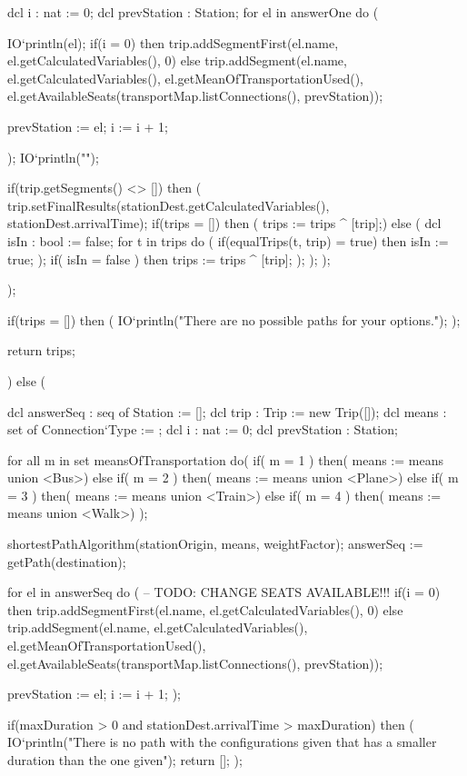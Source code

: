 \begin{vdmpp}[breaklines=true]
     dcl i : nat := 0;
     dcl prevStation : Station;
     for el in answerOne do (
      
      IO`println(el);
      if(i = 0) then trip.addSegmentFirst(el.name, el.getCalculatedVariables(), 0)
      else trip.addSegment(el.name, el.getCalculatedVariables(), el.getMeanOfTransportationUsed(), el.getAvailableSeats(transportMap.listConnections(), prevStation));
      
      prevStation := el;
      i := i + 1;

     );
     IO`println("\n\n");
     
     if(trip.getSegments() <> []) then (
      trip.setFinalResults(stationDest.getCalculatedVariables(), stationDest.arrivalTime);
      if(trips = []) then (
        trips := trips ^ [trip];)
      else (
        dcl isIn : bool := false;
        for t in trips do (
          if(equalTrips(t, trip) = true) then
            isIn := true;
        );
        if( isIn = false ) then
          trips := trips ^ [trip];
      );
     );
    );
    
   );
   
   if(trips = []) then (
     IO`println("There are no possible paths for your options."); 
   );
   
   return trips;
   
   
  ) 
  else (
   
   dcl answerSeq : seq of Station := [];
   dcl trip : Trip := new Trip([]);
   dcl means : set of Connection`Type := {};
   dcl i : nat := 0;
   dcl prevStation : Station;
   
   for all m in set meansOfTransportation do(
    if( m = 1 ) then(
    means := means union {<Bus>})
    else if( m = 2 ) then(
    means := means union {<Plane>})
    else if( m = 3 ) then(
    means := means union {<Train>})
    else if( m = 4 ) then(
    means := means union {<Walk>})
   );
      
   shortestPathAlgorithm(stationOrigin, means, weightFactor);
   answerSeq := getPath(destination);
   
   for el in answerSeq do (
     -- TODO: CHANGE SEATS AVAILABLE!!!
      if(i = 0) then trip.addSegmentFirst(el.name, el.getCalculatedVariables(), 0)
     else trip.addSegment(el.name, el.getCalculatedVariables(), el.getMeanOfTransportationUsed(), el.getAvailableSeats(transportMap.listConnections(), prevStation));
     
     prevStation := el;
     i := i + 1;
   );
   
   if(maxDuration > 0 and stationDest.arrivalTime > maxDuration) then (
    IO`println("There is no path with the configurations given that has a smaller duration than the one given");
    return []; 
   );
    

\end{vdmpp}
